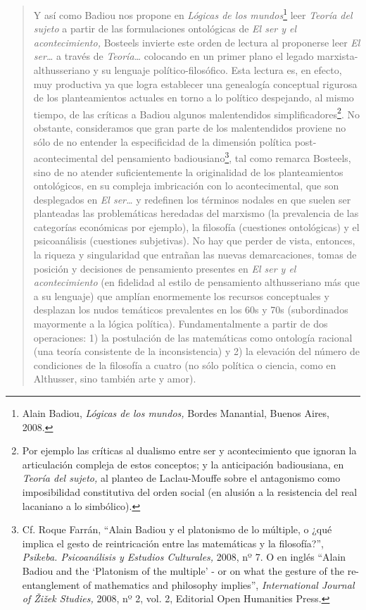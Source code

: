 \begin{quote}
Y así como Badiou nos propone en \emph{Lógicas de los mundos}\footnote{Alain Badiou, \emph{Lógicas de los mundos,} Bordes Manantial, Buenos Aires, 2008.} leer \emph{Teoría del sujeto} a partir de las formulaciones ontológicas de \emph{El ser y el acontecimiento,} Bosteels invierte este orden de lectura al proponerse leer \emph{El ser\ldots{}} a través de \emph{Teoría\ldots{}} colocando en un primer plano el legado marxista-althusseriano y su lenguaje político-filosófico. Esta lectura es, en efecto, muy productiva ya que logra establecer una genealogía conceptual rigurosa de los planteamientos actuales en torno a lo político despejando, al mismo tiempo, de las críticas a Badiou algunos malentendidos simplificadores\footnote{Por ejemplo las críticas al dualismo entre ser y acontecimiento que ignoran la articulación compleja de estos conceptos; y la anticipación badiousiana, en \emph{Teoría del sujeto,} al planteo de Laclau-Mouffe sobre el antagonismo como imposibilidad constitutiva del orden social (en alusión a la resistencia del real lacaniano a lo simbólico).}. No obstante, consideramos que gran parte de los malentendidos proviene no sólo de no entender la especificidad de la dimensión política post-acontecimental del pensamiento badiousiano\footnote{Cf. Roque Farrán, \enquote{Alain Badiou y el platonismo de lo múltiple, o ¿qué implica el gesto de reintricación entre las matemáticas y la filosofía?}, \emph{Psikeba. Psicoanálisis y Estudios Culturales,} 2008, nº 7. O en inglés \enquote{Alain Badiou and the \enquote{Platonism of the multiple} - or on what the gesture of the re-entanglement of mathematics and philosophy implies}, \emph{International Journal of Žižek Studies,} 2008, nº 2, vol. 2, Editorial Open Humanities Press.}, tal como remarca Bosteels, sino de no atender suficientemente la originalidad de los planteamientos ontológicos, en su compleja imbricación con lo acontecimental, que son desplegados en \emph{El ser\ldots{}} y redefinen los términos nodales en que suelen ser planteadas las problemáticas heredadas del marxismo (la prevalencia de las categorías económicas por ejemplo), la filosofía (cuestiones ontológicas) y el psicoanálisis (cuestiones subjetivas). No hay que perder de vista, entonces, la riqueza y singularidad que entrañan las nuevas demarcaciones, tomas de posición y decisiones de pensamiento presentes en \emph{El ser y el acontecimiento} (en fidelidad al estilo de pensamiento althusseriano más que a su lenguaje) que amplían enormemente los recursos conceptuales y desplazan los nudos temáticos prevalentes en los 60s y 70s (subordinados mayormente a la lógica política). Fundamentalmente a partir de dos operaciones: 1) la postulación de las matemáticas como ontología racional (una teoría consistente de la inconsistencia) y 2) la elevación del número de condiciones de la filosofía a cuatro (no sólo política o ciencia, como en Althusser, sino también arte y amor).


\end{quote}
